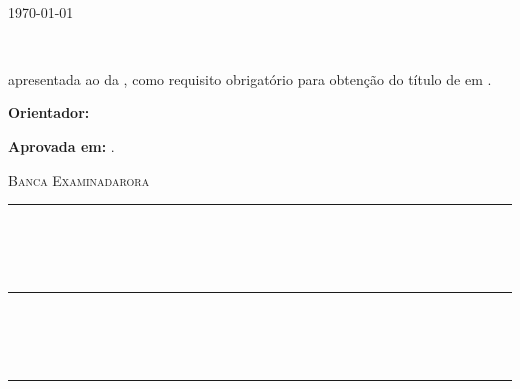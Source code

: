 \begin{center}
	{\large \textsc{\local}} \\
	\today
\end{center}

\newpage

\begin{center}
	{\large \textsc{\autor}}
\end{center}
\vspace{5mm}

\noindent{\LARGE \textsc{\titulo}} \\
\vspace{3mm}

\begin{flushright}
	\begin{minipage}{80mm}
		\manuscrito{} apresentada ao \programa{} da \universidade{}, como requisito obrigatório para obtenção do título de \graduacao{} em \curso. 
		\begin{flushright} \textbf{Orientador:} \orientador \end{flushright}
	\end{minipage}
\end{flushright}
\vspace{5mm}

\begin{flushleft}
	\textbf{Aprovada em:} \datadeaprovacao.
\end{flushleft} \vspace{5mm}

\begin{center}
	\textsc{Banca Examinadarora} \\ 
	\vspace{10mm}
	\rule{120mm}{0.1mm} \\
	\presidente \\
	\instituicaoI \\ 
	\vspace{10mm}
	\rule{120mm}{0.1mm} \\
	\internoI \\
	\instituicaoII \\ 
	\vspace{10mm}
	\rule{120mm}{0.1mm} \\
	\internoII \\
	\instituicaoIII
\end{center}

\newpage

